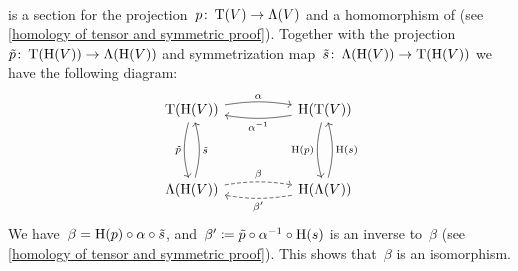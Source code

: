 \documentclass[a4paper,10pt,headings=standardclasses]{scrartcl}
\begin{document}
\begin{example}
\begin{enumerate}
\begin{align*}
      \end{align*}
      is a section for the projection~$p \colon \operatorname{T}(V) \to \operatorname{\Lambda}(V)$ and a homomorphism of {\dgvs} (see \cref{homology of tensor and symmetric proof}).
      Together with the projection~$\tilde{p} \colon \operatorname{T}(\operatorname{H}(V)) \to \operatorname{\Lambda}(\operatorname{H}(V))$ and symmetrization map~$\tilde{s} \colon \operatorname{\Lambda}(\operatorname{H}(V)) \to \operatorname{T}(\operatorname{H}(V))$ we have the following diagram:
      \[
        \begin{tikzcd}[column sep = huge, row sep = 4em]
          \dgTensor(\homology(V))
          \arrow[bend left = 9]{r}[above]{\alpha}
          \arrow[bend right = 15]{d}[left]{\tilde{p}}
          &
          \homology(\dgTensor(V))
          \arrow[bend left = 9]{l}[below]{\alpha^{-1}}
          \arrow[bend right = 15]{d}[left]{\homology(p)}
          \\
          \dgSymm(\homology(V))
          \arrow[bend right = 15]{u}[right]{\tilde{s}}
          \arrow[dashed, bend left = 9]{r}[above]{\beta}
          &
          \homology(\dgSymm(V))
          \arrow[bend right = 15]{u}[right]{\homology(s)}
          \arrow[dashed, bend left = 9]{l}[below]{\beta'}
        \end{tikzcd}
      \]
      We have~$\beta = \operatorname{H}(p) \circ \alpha \circ \tilde{s}$, and~$\beta' \coloneqq \tilde{p} \circ \alpha^{-1} \circ \operatorname{H}(s)$ is an inverse to~$\beta$ (see \cref{homology of tensor and symmetric proof}).
      This shows that~$\beta$ is an isomorphism.
  \end{enumerate}
\end{example}


\end{document}
